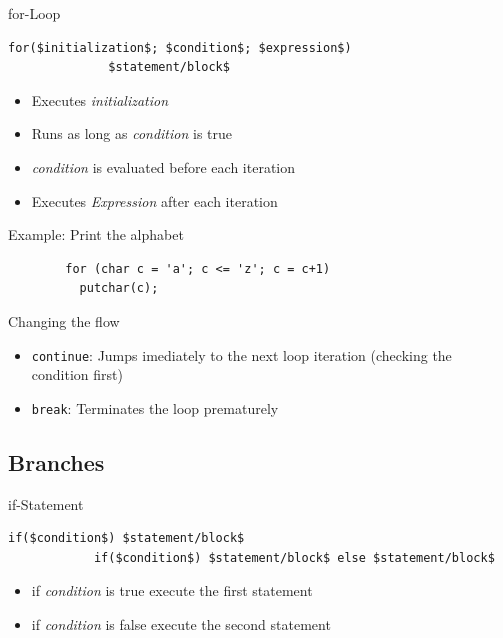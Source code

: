 \documentclass[english,compress]{beamer}
\begin{document}
\begin{frame}[fragile]
	\begin{block}{for-Loop}
		\begin{lstlisting}[numbers=none]
			for($initialization$; $condition$; $expression$)
			  $statement/block$
		\end{lstlisting}
		\begin{itemize}
			\item Executes \textit{initialization}
			\item Runs as long as \textit{condition} is true
			\item \textit{condition} is evaluated before each iteration
			\item Executes \textit{Expression} after each iteration
		\end{itemize}
	\end{block}
\end{frame}

\begin{frame}[fragile]{Example: Print the alphabet}
	\begin{lstlisting}
		for (char c = 'a'; c <= 'z'; c = c+1)
		  putchar(c);
	\end{lstlisting}
\end{frame}

\begin{frame}{Changing the flow}
	\begin{itemize}
		\item \lstinline|continue|: Jumps imediately to the next loop iteration (checking the condition first)
		\item \lstinline|break|: Terminates the loop prematurely
	\end{itemize}
\end{frame}

\subsection{Branches}
\begin{frame}[fragile]
	\begin{block}{if-Statement}
		\begin{lstlisting}[numbers=none]
			if($condition$) $statement/block$ 
			if($condition$) $statement/block$ else $statement/block$ 
		\end{lstlisting}
		\begin{itemize}
			\item if \textit{condition} is true execute the first statement
			\item if \textit{condition} is false execute the second statement

		\end{itemize}
	\end{block}
\end{frame}
\end{document}
